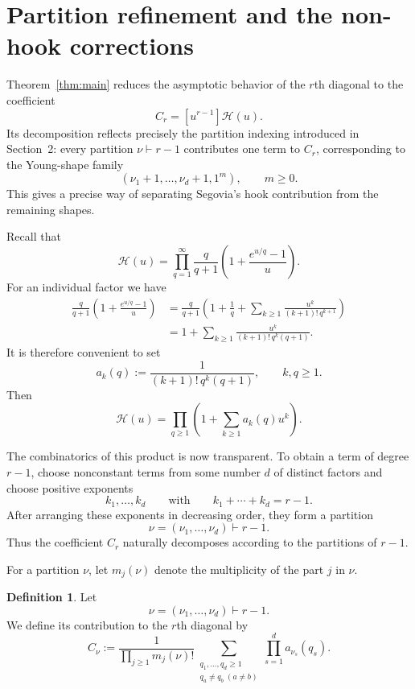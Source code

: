 \documentclass[11pt]{article}
\theoremstyle{definition}
\newtheorem{definition}[theorem]{Definition}
\begin{document}
\section{Partition refinement and the non-hook corrections}
\label{sec:partition-refinement}

Theorem~\ref{thm:main} reduces the asymptotic behavior of the $r$th
diagonal to the coefficient
\[
        C_r=[u^{r-1}]\mathcal H(u).
\]
Its decomposition reflects precisely the partition indexing introduced
in Section~2: every partition $\nu\vdash r-1$ contributes one term to
$C_r$, corresponding to the Young-shape family
\[
        (\nu_1+1,\ldots,\nu_d+1,1^m),\qquad m\geq0.
\]
This gives a precise way of separating Segovia's hook contribution
from the remaining shapes.


Recall that
\[
 \mathcal H(u)
 =
 \prod_{q=1}^\infty
 \frac{q}{q+1}
 \left(
 1+\frac{e^{u/q}-1}{u}
 \right).
\]
For an individual factor we have
\begin{align*}
 \frac{q}{q+1}
 \left(
 1+\frac{e^{u/q}-1}{u}
 \right)
 &=
 \frac{q}{q+1}
 \left(
 1+\frac1q+
 \sum_{k\geq1}
 \frac{u^k}{(k+1)!\,q^{k+1}}
 \right)\\
 &=
 1+
 \sum_{k\geq1}
 \frac{u^k}{(k+1)!\,q^k(q+1)}.
\end{align*}
It is therefore convenient to set
\begin{equation}\label{eq:ak}
        a_k(q)
        :=
        \frac{1}{(k+1)!\,q^k(q+1)},
        \qquad k,q\geq1.
\end{equation}
Then
\begin{equation}\label{eq:Hcal-ak}
        \mathcal H(u)
        =
        \prod_{q\geq1}
        \left(
        1+\sum_{k\geq1}a_k(q)u^k
        \right).
\end{equation}

The combinatorics of this product is now transparent.  To obtain a
term of degree $r-1$, choose nonconstant terms from some number $d$
of distinct factors and choose positive exponents
\[
        k_1,\ldots,k_d
        \qquad\text{with}\qquad
        k_1+\cdots+k_d=r-1.
\]
After arranging these exponents in decreasing order, they form a
partition
\[
        \nu=(\nu_1,\ldots,\nu_d)\vdash r-1.
\]
Thus the coefficient $C_r$ naturally decomposes according to the
partitions of $r-1$.

For a partition $\nu$, let $m_j(\nu)$ denote the multiplicity of the
part $j$ in $\nu$.

\begin{definition}
Let
\[
        \nu=(\nu_1,\ldots,\nu_d)\vdash r-1.
\]
We define its contribution to the $r$th diagonal by
\begin{equation}\label{eq:Cnu}
 C_\nu
 :=
 \frac{1}{\prod_{j\geq1}m_j(\nu)!}
 \sum_{\substack{q_1,\ldots,q_d\geq1\\
                 q_a\neq q_b\;(a\neq b)}}
 \prod_{s=1}^d a_{\nu_s}(q_s).
\end{equation}
\end{definition}
\end{document}

